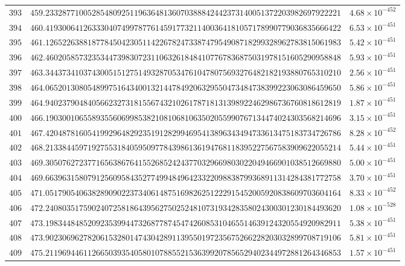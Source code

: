 \documentclass[12pt,reqno]{amsart}
\theoremstyle{remark}
\begin{document}
\begin{longtable}{clc}
$393$ & $459.2332877100528548092511963648136070388842442373140051372203982697922221$ & $4.68\times 10^{-452}$ \\
$394$ & $460.4193006412633304074997877614591773211400364181057178990779036835666422$ & $6.53\times 10^{-451}$ \\
$395$ & $461.1265226388187784504230511422678247338747954908718299328962783815061983$ & $5.42\times 10^{-451}$ \\
$396$ & $462.4602058573235344739830723110632618484107767836875031978151605290958848$ & $5.93\times 10^{-451}$ \\
$397$ & $463.3443734103743005151275149328705347610478075693276482182193880765310210$ & $2.56\times 10^{-451}$ \\
$398$ & $464.0652013080548997516434001321447849206329550473484738399223063086459650$ & $5.86\times 10^{-451}$ \\
$399$ & $464.9402379048405662327318155674321026178718131398922462986736760818612819$ & $1.87\times 10^{-451}$ \\
$400$ & $466.1903001065589355606998538210810681063502055990767134474024303568214696$ & $3.15\times 10^{-451}$ \\
$401$ & $467.4204878160541992964829235191282994695413896343494733613475183734726786$ & $8.28\times 10^{-452}$ \\
$402$ & $468.2133844597192755318405950977843986136194768118395227567583909622055214$ & $5.44\times 10^{-451}$ \\
$403$ & $469.3050762723771656386764155268524243770329669803022049466901038512669880$ & $5.00\times 10^{-451}$ \\
$404$ & $469.6639631580791256095843527749948496423322098838799368911314284381772758$ & $3.70\times 10^{-451}$ \\
$405$ & $471.0517905406382890902237340614875169826251222915452005920838609703604164$ & $8.33\times 10^{-452}$ \\
$406$ & $472.2408035175902407258186439562750252481073193428358024300301230184493620$ & $1.08\times 10^{-528}$ \\
$407$ & $473.1983448485209235399447326877874547426085310465514639124320554920982911$ & $5.38\times 10^{-451}$ \\
$408$ & $473.9023069627820615328014743042891139550197235675266228203032899708719106$ & $5.81\times 10^{-451}$ \\
$409$ & $475.2119694461126650393540580107885521536399207856529402344972881264346853$ & $1.57\times 10^{-451}$ \\

\end{longtable}
\end{document}
